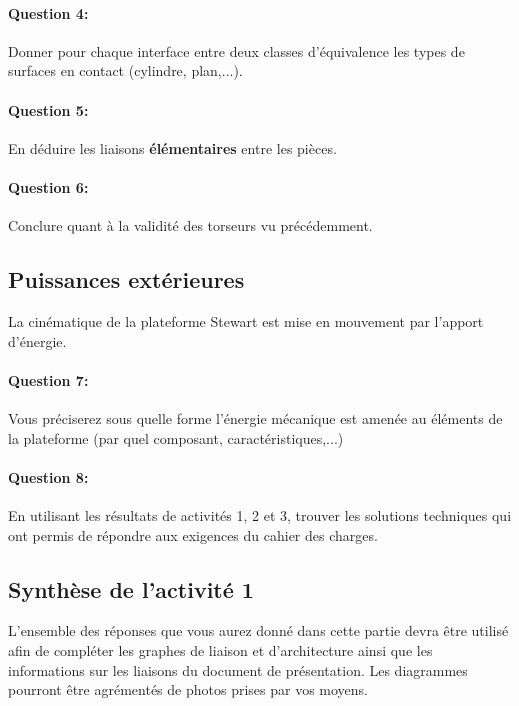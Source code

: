 \paragraph{Question 4:} Donner pour chaque interface entre deux classes d'équivalence les types de surfaces en contact (cylindre, plan,...).

\reponse[3]

\paragraph{Question 5:} En déduire les liaisons \textbf{élémentaires} entre les pièces.

\reponse[3]

\paragraph{Question 6:} Conclure quant à la validité des torseurs vu précédemment.

\reponse[3]

\subsection{Puissances extérieures}

La cinématique de la plateforme Stewart est mise en mouvement par l'apport d'énergie.

\paragraph{Question 7:} Vous préciserez sous quelle forme l'énergie mécanique est amenée au éléments de la plateforme (par quel composant, caractéristiques,...)

\reponse[3]

\paragraph{Question 8:} En utilisant les résultats de activités 1, 2 et 3, trouver les solutions techniques qui ont permis de répondre aux exigences du cahier des charges.

\subsection{Synthèse de l'activité 1}

L'ensemble des réponses que vous aurez donné dans cette partie devra être utilisé afin de compléter les graphes de liaison et d'architecture ainsi que les informations sur les liaisons du document de présentation. Les diagrammes pourront être agrémentés de photos prises par vos moyens.

